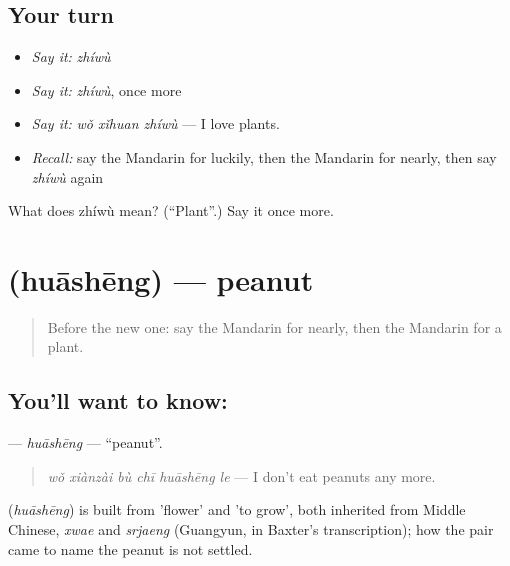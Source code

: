 \subsection*{Your turn}
\begin{itemize}
\raggedright
  \item \emph{Say it:} \emph{zhíwù}
  \item \emph{Say it:} \emph{zhíwù}, once more
  \item \emph{Say it:} \emph{wǒ xǐhuan zhíwù} — I love plants.
  \item \emph{Recall:} say the Mandarin for luckily, then the Mandarin for nearly, then say \emph{zhíwù} again
\end{itemize}

\begin{tcolorbox}[breakable,colback=teal!4,colframe=teal!35!black,title={Before you move on}]
What does zhíwù mean? (\textquotedblleft{}Plant\textquotedblright{}.) Say it once more.
\end{tcolorbox}
\section[\texorpdfstring{\zh{花生} (huāshēng)}{花生 (huāshēng)}]{ (huāshēng) — peanut}

\label{lesson:ZH-C237-huasheng}



\begin{quote}
Before the new one: say the Mandarin for nearly, then the Mandarin for a plant.
\end{quote}

\subsection*{You'll want to know: }
\textbf{} — \emph{huāshēng} — \textquotedblleft{}peanut\textquotedblright{}.

\begin{quote}
\textbf{} \emph{wǒ xiànzài bù chī huāshēng le} — I don't eat peanuts any more.
\end{quote}

\begin{cousinweb}
\textbf{} (\emph{huāshēng}) is built from  'flower' and  'to grow', both inherited from Middle Chinese, \emph{xwae} and \emph{srjaeng} (Guangyun, in Baxter's transcription); how the pair came to name the peanut is not settled.
\end{cousinweb}

